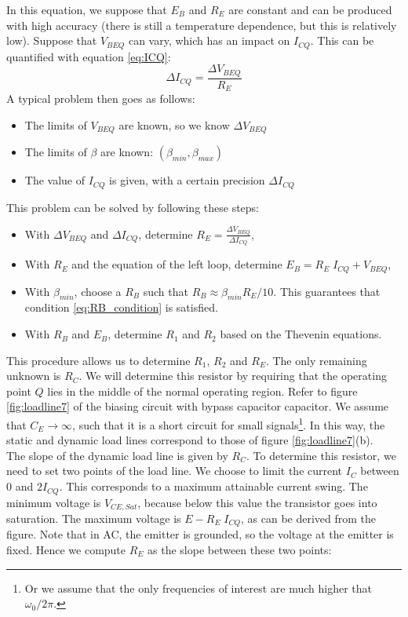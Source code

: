 In this equation, we suppose that $E_B$ and $R_E$ are constant and can be produced with high accuracy (there is still a temperature dependence, but this is relatively low). Suppose that $V_{BEQ}$ can vary, which has an impact on $I_{CQ}$. This can be quantified with equation \ref{eq:ICQ}:
\begin{equation}
	\Delta I_{CQ} = \frac{\Delta V_{BEQ}}{R_E}
\end{equation}
A typical problem then goes as follows:
\begin{itemize}
	\item The limits of $V_{BEQ}$ are known, so we know $\Delta V_{BEQ}$
	\item The limits of $\beta$ are known: $(\beta_{min}, \beta_{max})$
	\item The value of $I_{CQ}$ is given, with a certain precision $\Delta I_{CQ}$
\end{itemize}
This problem can be solved by following these steps:
\begin{itemize}
	\item With $\Delta V_{BEQ}$ and $\Delta I_{CQ}$, determine $R_E = \frac{\Delta V_{BEQ}}{\Delta I_{CQ}}$,
	\item With $R_E$ and the equation of the left loop, determine $E_B=R_E \; I_{CQ} + V_{BEQ}$,
	\item With $\beta_{min}$, choose a $R_B$ such that $R_B \approx \beta_{min} R_E/10$. This guarantees that condition \ref{eq:RB_condition} is satisfied.
	\item With $R_B$ and $E_B$, determine $R_1$ and $R_2$ based on the Thevenin equations.
\end{itemize}
This procedure allows us to determine $R_1$, $R_2$ and $R_E$. The only remaining unknown is $R_C$. We will determine this resistor by requiring that the operating point $Q$ lies in the middle of the normal operating region. Refer to figure \ref{fig:loadline7} of the biasing circuit with bypass capacitor capacitor. We assume that $C_E \rightarrow \infty$, such that it is a short circuit for small signals\footnote{Or we assume that the only frequencies of interest are much higher that $ \omega_0/2\pi$.}. In this way, the static and dynamic load lines correspond to those of figure \ref{fig:loadline7}(b).\\
The slope of the dynamic load line is given by $R_C$. To determine this resistor, we need to set two points of the load line. We choose to limit the current $I_C$ between $0$ and $2 I_{CQ}$. This corresponds to a maximum attainable current swing. The minimum voltage is $V_{CE, Sat}$, because below this value the transistor goes into saturation. The maximum voltage is $E-R_E\;I_{CQ}$, as can be derived from the figure. Note that in AC, the emitter is grounded, so the voltage at the emitter is fixed. Hence we compute $R_E$ as the slope between these two points:
